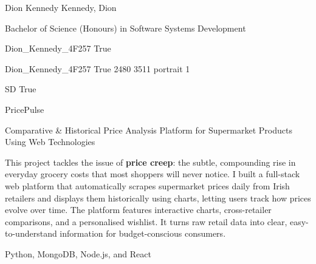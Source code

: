 
\begingroup{}\relax



\def\Key{Dion_Kennedy_4F257}

{Dion Kennedy}
{Kennedy, Dion}

{Bachelor of Science (Honours) in Software Systems Development}

{Dion_Kennedy_4F257}
{True}

{Dion_Kennedy_4F257}
{True}
{2480}
{3511}
{portrait}
{1}

{SD}
{True}

{PricePulse}

{Comparative \& Historical Price Analysis Platform for Supermarket Products Using Web Technologies}

{This project tackles the issue of {\bfseries price creep}: the subtle, compounding rise in everyday grocery costs that most shoppers will never notice. I built a full-stack web platform that automatically scrapes supermarket prices daily from Irish retailers and displays them historically using charts, letting users track how prices evolve over time. The platform features interactive charts, cross-retailer comparisons, and a personalised wishlist. It turns raw retail data into clear, easy-to-understand information for budget-conscious consumers.}

{Python, MongoDB, Node.js, and React}

